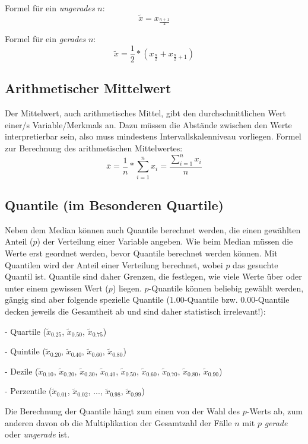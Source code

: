 \documentclass[11pt,a4paper]{article}
\begin{document}
Formel für ein \textit{ungerades} $n$: 
$$\tilde{x} = x_{\frac{n+1}{2}}$$ 

Formel für ein \textit{gerades} $n$: 
$$\tilde{x}=\frac{1}{2}*(x_{\frac{n}{2}} + x_{\frac{n}{2}+1})$$

\subsection{Arithmetischer Mittelwert}
Der Mittelwert, auch arithmetisches Mittel, gibt den durchschnittlichen Wert einer/s Variable/Merkmals an. Dazu müssen die Abstände zwischen den Werte interpretierbar sein, also muss mindestens Intervallskalenniveau vorliegen.
Formel zur Berechnung des arithmetischen Mittelwertes: \\
$$\bar{x} = \frac{1}{n} * \sum_{i=1}^n x_i = \frac{\sum_{i=1}^n{x_i}}{n}$$

\subsection{Quantile (im Besonderen Quartile)}
Neben dem Median können auch Quantile berechnet werden, die einen gewählten Anteil ($p$) der Verteilung einer Variable angeben. Wie beim Median müssen die Werte erst geordnet werden, bevor Quantile berechnet werden können. Mit Quantilen wird der Anteil einer Verteilung berechnet, wobei $p$ das gesuchte Quantil ist. Quantile sind daher Grenzen, die festlegen, wie viele Werte über oder unter einem gewissen Wert ($p$) liegen. 
$p$-Quantile können beliebig gewählt werden, gängig sind aber folgende spezielle Quantile ($1.00$-Quantile bzw. $0.00$-Quantile decken jeweils die Gesamtheit ab und sind daher statistisch irrelevant!): 

- Quartile ($\tilde{x}_{0.25}$, $\tilde{x}_{0.50}$, $\tilde{x}_{0.75}$)

- Quintile ($\tilde{x}_{0.20}$, $\tilde{x}_{0.40}$, $\tilde{x}_{0.60}$, $\tilde{x}_{0.80}$)

- Dezile ($\tilde{x}_{0.10}$, $\tilde{x}_{0.20}$, $\tilde{x}_{0.30}$, $\tilde{x}_{0.40}$, $\tilde{x}_{0.50}$, $\tilde{x}_{0.60}$, $\tilde{x}_{0.70}$, $\tilde{x}_{0.80}$, $\tilde{x}_{0.90}$) 

- Perzentile ($\tilde{x}_{0.01}$, $\tilde{x}_{0.02}$, $...$, $\tilde{x}_{0.98}$, $\tilde{x}_{0.99}$)
\newline

Die Berechnung der Quantile hängt zum einen von der Wahl des $p$-Werts ab, zum anderen davon ob die Multiplikation der Gesamtzahl der Fälle $n$ mit $p$ \textit{gerade} oder \textit{ungerade} ist. 
\end{document}

